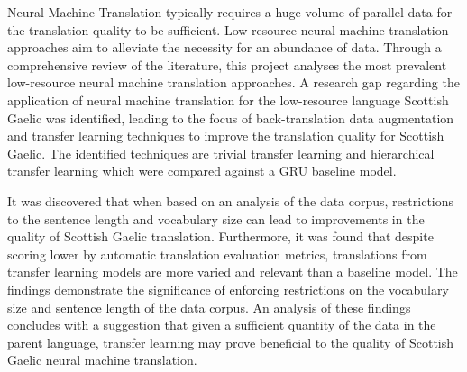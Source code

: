 
Neural Machine Translation typically requires a huge volume of parallel data for the translation quality to be sufficient. Low-resource neural machine translation approaches aim to alleviate the necessity for an abundance of data.
Through a comprehensive review of the literature, this project analyses the most prevalent low-resource neural machine translation approaches. A research gap regarding the application of neural machine translation for the low-resource language Scottish Gaelic was identified, leading to the focus of back-translation data augmentation and transfer learning techniques to improve the translation quality for Scottish Gaelic. The identified techniques are trivial transfer learning and hierarchical transfer learning which were compared against a GRU baseline model.

It was discovered that when based on an analysis of the data corpus, restrictions to the sentence length and vocabulary size can lead to improvements in the quality of Scottish Gaelic translation. Furthermore, it was found that despite scoring lower by automatic translation evaluation metrics, translations from transfer learning models are more varied and relevant than a baseline model.
The findings demonstrate the significance of enforcing restrictions on the vocabulary size and sentence length of the data corpus. An analysis of these findings concludes with a suggestion that given a sufficient quantity of the data in the parent language, transfer learning may prove beneficial to the quality of Scottish Gaelic neural machine translation.